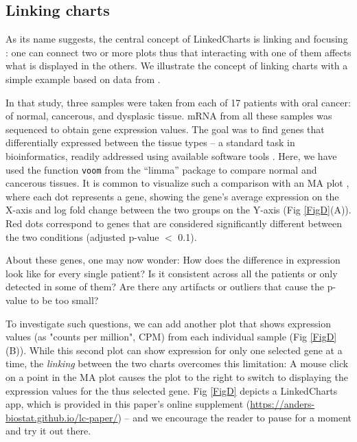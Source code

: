 \documentclass[twocolumn,10pt]{article}
\begin{document}
\subsection{Linking charts}

As its name suggests, the central concept of LinkedCharts is linking and focusing \citep{buja_1991}: one can connect two or more plots thus that interacting with one of them affects what is displayed in the others. We illustrate the concept of linking charts with a simple example based on data from \citet{conway_2015}.

In that study, three samples were taken from each of 17 patients with oral cancer: of normal, cancerous, and dysplasic tissue. mRNA from all these samples was sequenced to obtain gene expression values. The goal was to find genes that differentially expressed between the tissue types -- a standard task in bioinformatics, readily addressed using available software tools \citep{ritchie_2015, love_2014}. Here, we have used the function \texttt{voom} from the ``limma'' package \citep{law_2014} to compare normal and cancerous tissues. It is common to visualize such a comparison with an MA plot \citep{dudoit_2002}, where each dot represents a gene, showing the gene's average expression on the X-axis and log fold change between the two groups on the Y-axis (Fig \ref{FigD}(A)). Red dots correspond to genes that are considered significantly different between the two conditions (adjusted p-value $<$ 0.1). 

About these genes, one may now wonder: How does the difference in expression look like for every single patient? Is it consistent across all the patients or only detected in some of them? Are there any artifacts or outliers that cause the p-value to be too small?

To investigate such questions, we can add another plot that shows expression values (as "counts per million", CPM) from each individual sample (Fig \ref{FigD}(B)). While this second plot can show expression for only one selected gene at a time, the \emph{linking} between the two charts  overcomes this limitation: A mouse click on a point in the MA plot causes the plot to the right to switch to displaying the expression values for the thus selected gene. Fig \ref{FigD} depicts a LinkedCharts app, which is provided in this paper's online supplement (\url{https://anders-biostat.github.io/lc-paper/}) -- and we encourage the reader to pause for a moment and try it out there. 
\end{document}
